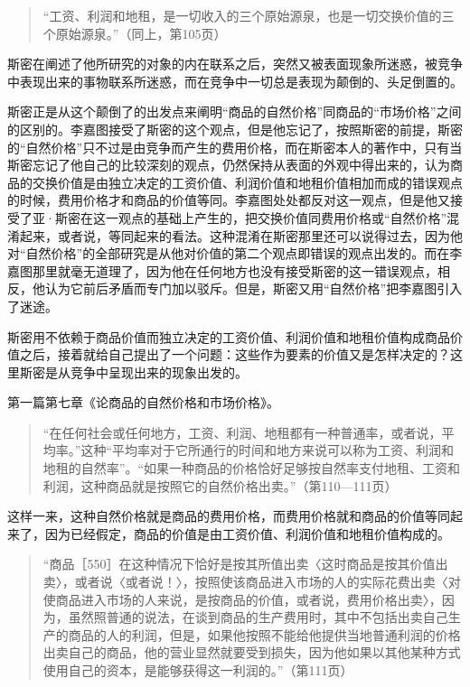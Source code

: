 \begin{quote}{“工资、利润和地租，是一切收入的三个原始源泉，也是一切交换价值的三个原始源泉。”（同上，第105页）}\end{quote}

斯密在阐述了他所研究的对象的内在联系之后，突然又被表面现象所迷惑，被竞争中表现出来的事物联系所迷惑，而在竞争中一切总是表现为颠倒的、头足倒置的。

斯密正是从这个颠倒了的出发点来阐明“商品的自然价格”同商品的“市场价格”之间的区别的。李嘉图接受了斯密的这个观点，但是他忘记了，按照斯密的前提，斯密的“自然价格”只不过是由竞争而产生的费用价格，而在斯密本人的著作中，只有当斯密忘记了他自己的比较深刻的观点，仍然保持从表面的外观中得出来的，认为商品的交换价值是由独立决定的工资价值、利润价值和地租价值相加而成的错误观点的时候，费用价格才和商品的价值等同。李嘉图处处都反对这一观点，但是他又接受了亚·斯密在这一观点的基础上产生的，把交换价值同费用价格或“自然价格”混淆起来，或者说，等同起来的看法。这种混淆在斯密那里还可以说得过去，因为他对“自然价格”的全部研究是从他对价值的第二个观点即错误的观点出发的。而在李嘉图那里就毫无道理了，因为他在任何地方也没有接受斯密的这一错误观点，相反，他认为它前后矛盾而专门加以驳斥。但是，斯密又用“自然价格”把李嘉图引入了迷途。

斯密用不依赖于商品价值而独立决定的工资价值、利润价值和地租价值构成商品价值之后，接着就给自己提出了一个问题：这些作为要素的价值又是怎样决定的？这里斯密是从竞争中呈现出来的现象出发的。

第一篇第七章《论商品的自然价格和市场价格》。

\begin{quote}{“在任何社会或任何地方，工资、利润、地租都有一种普通率，或者说，平均率。”这种“平均率对于它所通行的时间和地方来说可以称为工资、利润和地租的自然率”。“如果一种商品的价格恰好足够按自然率支付地租、工资和利润，这种商品就是按照它的自然价格出卖。”（第110—111页）}\end{quote}

这样一来，这种自然价格就是商品的费用价格，而费用价格就和商品的价值等同起来了，因为已经假定，商品的价值是由工资价值、利润价值和地租价值构成的。

\begin{quote}{“商品［550］在这种情况下恰好是按其所值出卖〈这时商品是按其价值出卖〉，或者说〈或者说！〉，按照使该商品进入市场的人的实际花费出卖〈对使商品进入市场的人来说，是按商品的价值，或者说，费用价格出卖〉，因为，虽然照普通的说法，在谈到商品的生产费用时，其中不包括出卖自己生产的商品的人的利润，但是，如果他按照不能给他提供当地普通利润的价格出卖自己的商品，他的营业显然就要受到损失，因为他如果以其他某种方式使用自己的资本，是能够获得这一利润的。”（第111页）}\end{quote}

